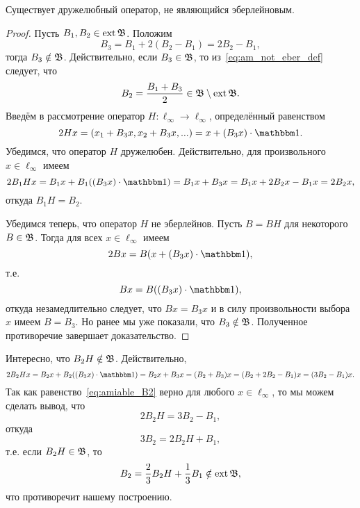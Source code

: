 \begin{theorem}
	\label{thm:amiable_but_not_Eberlein_exists}
	Существует дружелюбный оператор, не являющийся эберлейновым.
\end{theorem}

\begin{proof}
	Пусть $B_1, B_2 \in \operatorname{ext} \mathfrak{B}$.
	Положим
	\begin{equation}
		\label{eq:am_not_eber_def}
		B_3 = B_1 + 2(B_2-B_1) = 2B_2-B_1,
	\end{equation}
	тогда $B_3 \notin \mathfrak{B}$.
	Действительно, если $B_3 \in \mathfrak{B}$, то из~\eqref{eq:am_not_eber_def} следует, что
	\begin{equation}
		B_2 = \frac{B_1 + B_3}2 \in \mathfrak{B} \setminus \operatorname{ext} \mathfrak{B}
		.
	\end{equation}
	Введём в рассмотрение оператор $H:\ell_\infty\to\ell_\infty$, определённый равенством
	\begin{equation}
		2Hx = (x_1 + B_3x, x_2 + B_3x, ...) = x + (B_3 x) \cdot \one
		.
	\end{equation}
	Убедимся, что оператор $H$ дружелюбен.
	Действительно, для произвольного $x\in\ell_\infty$ имеем
	\begin{equation}
		2 B_1 H x = B_1 x + B_1 ((B_3 x) \cdot\one) = B_1 x + B_3 x =
		B_1 x + 2 B_2 x - B_1 x = 2B_2 x
		,
	\end{equation}
	откуда $B_1 H = B_2$.

	Убедимся теперь, что оператор $H$ не эберлейнов.
	Пусть $B = BH$ для некоторого $B\in\mathfrak{B}$.
	Тогда для всех $x\in\ell_\infty$ имеем
	\begin{equation}
		2Bx = B (x + (B_3 x) \cdot \one)
		,
	\end{equation}
	т.е.
	\begin{equation}
		Bx =  B((B_3 x) \cdot \one)
		,
	\end{equation}
	откуда незамедлительно следует, что $Bx = B_3x$ и в силу произвольности выбора $x$ имеем $B=B_3$.
	Но ранее мы уже показали, что $B_3\notin \mathfrak{B}$.
	Полученное противоречие завершает доказательство.
\end{proof}

\begin{remark}
	Интересно, что $B_2H\notin \mathfrak{B}$.
	Действительно,
	\begin{equation}
		\label{eq:amiable_B2}
		2B_2 H x = B_2 x + B_2((B_3 x)\cdot \one) = B_2 x + B_3 x  =
		(B_2 + B_3) x  = (B_2+2B_2-B_1)x = (3B_2-B_1)x
		.
	\end{equation}
	Так как равенство~\eqref{eq:amiable_B2} верно для любого $x\in\ell_\infty$,
	то мы можем сделать вывод, что
	\begin{equation}
		2B_2H = 3B_2-B_1
		,
	\end{equation}
	откуда
	\begin{equation}
		3B_2 = 2B_2H  + B_1
		,
	\end{equation}
	т.е. если $B_2H\in\mathfrak{B}$, то
	\begin{equation}
		B_2 = \frac23 B_2H  + \frac13 B_1 \notin \operatorname{ext}\mathfrak{B}
		,
	\end{equation}
	что противоречит нашему построению.
\end{remark}

